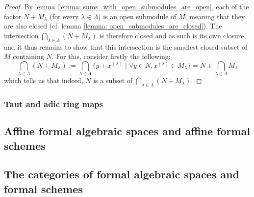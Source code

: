                 \begin{proof}
                    By lemma \ref{lemma: sums_with_open_submodules_are_open}, each of the factor $N + M_{\lambda}$ (for every $\lambda \in \Lambda$) is an open submodule of $M$, meaning that they are also closed (cf. lemma \ref{lemma: open_submodules_are_closed}). The intersection $\bigcap_{\lambda \in \Lambda} (N + M_{\lambda})$ is therefore closed and as such is its own closure, and it thus remains to show that this intersection is the smallest closed subset of $M$ containing $N$. For this, consider firstly the following:
                        $$\bigcap_{\lambda \in \Lambda} (N + M_{\lambda}) := \bigcap_{\lambda \in \Lambda} \{y + x^{(\lambda)} \mid \forall y \in N, x^{(\lambda)} \in M_{\lambda}\} = N + \bigcap_{\lambda \in \Lambda} M_{\lambda}$$
                    which tells us that indeed, $N$ is a subset of $\bigcap_{\lambda \in \Lambda} (N + M_{\lambda})$. 
                \end{proof}
        
        \subsubsection{Taut and adic ring maps}
        
    \subsection{Affine formal algebraic spaces and affine formal schemes}
    
    \subsection{The categories of formal algebraic spaces and formal schemes}